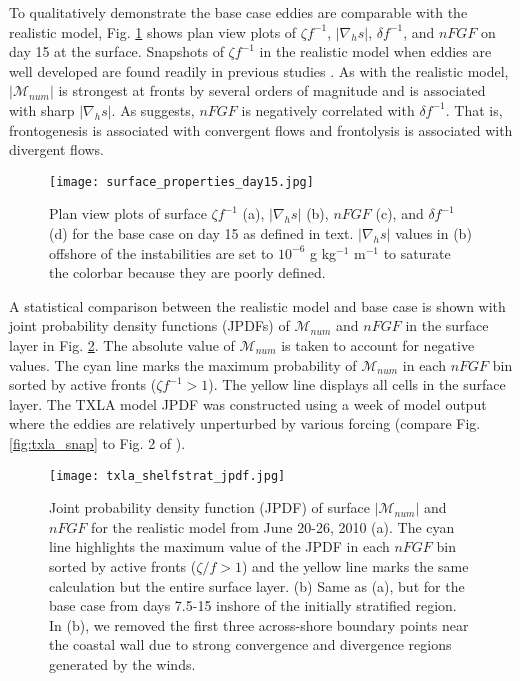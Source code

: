 \documentclass[draft]{agujournal2019}
\begin{document}
To qualitatively demonstrate the base case eddies are comparable with the realistic model, Fig. \ref{fig:base_case_plan} shows plan view plots of $\zeta f^{-1}$, $|\nabla_h s|$, $\delta f^{-1}$, and $nFGF$ on day 15 at the surface. Snapshots of $\zeta f^{-1}$ in the realistic model when eddies are well developed are found readily in previous studies \cite{Hetland_2017, Kobashi_2020, Qu_2022_NIW}. As with the realistic model, $|\mathcal{M}_{num}|$ is strongest at fronts by several orders of magnitude and is associated with sharp $|\nabla_h s|$. As  suggests, $nFGF$ is negatively correlated with $\delta f^{-1}$. That is, frontogenesis is associated with convergent flows and frontolysis is associated with divergent flows. %

\begin{figure}[t]
    \begin{center}
    \texttt{[image: surface\_properties\_day15.jpg]}\\
    \caption{Plan view plots of surface $\zeta f^{-1}$ (a), $|\nabla_h s|$ (b), $nFGF$ (c), and $\delta f^{-1}$ (d) for the base case on day 15 as defined in text. $|\nabla_h s|$ values in (b) offshore of the instabilities are set to $10^{-6}$ g kg$^{-1}$ m$^{-1}$ to saturate the colorbar because they are poorly defined.}
    \label{fig:base_case_plan}
     \end{center}
\end{figure}

A statistical comparison between the realistic model and base case is shown with joint probability density functions (JPDFs) of $\mathcal{M}_{num}$ and $nFGF$ in the surface layer in Fig. \ref{fig:jpdf}. The absolute value of $\mathcal{M}_{num}$ is taken to account for negative values. The cyan line marks the maximum probability of $\mathcal{M}_{num}$ in each $nFGF$ bin sorted by active fronts ($\zeta f^{-1}>1$). The yellow line displays all cells in the surface layer. The TXLA model JPDF was constructed using a week of model output where the eddies are relatively unperturbed by various forcing (compare Fig. \ref{fig:txla_snap} to Fig. 2 of ). 

\begin{figure}[t]
    \begin{center}
    \texttt{[image: txla\_shelfstrat\_jpdf.jpg]}\\
    \caption{Joint probability density function (JPDF) of surface $|\mathcal{M}_{num}|$ and $nFGF$  for the realistic model from June 20-26, 2010 (a). The cyan line highlights the maximum value of the JPDF in each $nFGF$ bin sorted by active fronts ($\zeta/f>1$)  and the yellow line marks the same calculation but the entire surface layer. (b) Same as (a), but for the base case from days 7.5-15 inshore of the initially stratified region.  In (b), we removed the first three across-shore boundary points near the coastal wall due to strong convergence and divergence regions generated by the winds.}\label{fig:jpdf}
     \end{center}
\end{figure}
\end{document}
